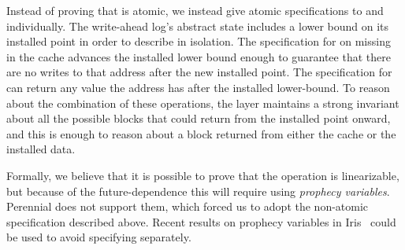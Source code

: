 Instead of proving that  is atomic, we instead give atomic specifications to
 and  individually. The write-ahead log's
abstract state includes a lower bound on its installed point in order to
describe  in isolation. The specification for 
on missing in the cache
advances the installed lower bound enough to guarantee that there are no writes
to that address after the new installed point. The specification for
 can return any value the address has after the
installed lower-bound. To reason about the combination of these operations, the
 layer maintains a strong invariant about all the possible blocks that
 could return from the installed point onward, and this is enough to
reason about a block returned from either the cache or the installed data.

Formally, we believe that it is possible to prove that the  
operation is linearizable, but because of the future-dependence this
will require using \emph{prophecy variables}.  Perennial
does not support them, which forced us to adopt the non-atomic
specification described above.  Recent results on prophecy variables
in Iris~\cite{jung:prophecy} could be used to avoid specifying
 separately.
